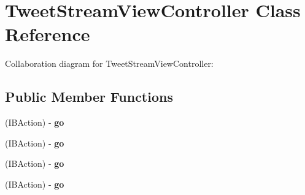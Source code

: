 \hypertarget{interface_tweet_stream_view_controller}{
\section{\-Tweet\-Stream\-View\-Controller \-Class \-Reference}
\label{interface_tweet_stream_view_controller}
}


\-Collaboration diagram for \-Tweet\-Stream\-View\-Controller\-:
\subsection*{\-Public \-Member \-Functions}
\begin{DoxyCompactItemize}
\item 
\hypertarget{interface_tweet_stream_view_controller_a4aad0bb53048759d0aaf3b3f5e7b9db4}{
(\-I\-B\-Action) -\/ {\bfseries go}}
\label{interface_tweet_stream_view_controller_a4aad0bb53048759d0aaf3b3f5e7b9db4}

\item 
\hypertarget{interface_tweet_stream_view_controller_a4aad0bb53048759d0aaf3b3f5e7b9db4}{
(\-I\-B\-Action) -\/ {\bfseries go}}
\label{interface_tweet_stream_view_controller_a4aad0bb53048759d0aaf3b3f5e7b9db4}

\item 
\hypertarget{interface_tweet_stream_view_controller_a4aad0bb53048759d0aaf3b3f5e7b9db4}{
(\-I\-B\-Action) -\/ {\bfseries go}}
\label{interface_tweet_stream_view_controller_a4aad0bb53048759d0aaf3b3f5e7b9db4}

\item 
\hypertarget{interface_tweet_stream_view_controller_a4aad0bb53048759d0aaf3b3f5e7b9db4}{
(\-I\-B\-Action) -\/ {\bfseries go}}
\label{interface_tweet_stream_view_controller_a4aad0bb53048759d0aaf3b3f5e7b9db4}

\end{DoxyCompactItemize}
